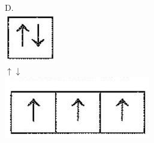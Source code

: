 \documentclass[10pt]{article}
\begin{document}
D.\\
\includegraphics[max width=\textwidth, center]{2025_10_23_76620c17ffac1ae9b35bg-12(4)}\\
$\uparrow \downarrow$\\
\includegraphics[max width=\textwidth, center]{2025_10_23_76620c17ffac1ae9b35bg-12(3)}\\
\end{document}
